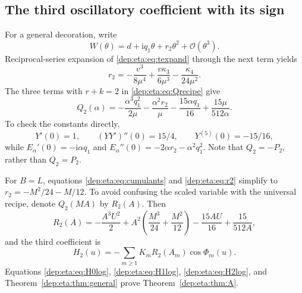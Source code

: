 \documentclass[11pt]{article}
\theoremstyle{definition}\newtheorem{definition}[theorem]{Definition}
\theoremstyle{remark}\newtheorem{remark}[theorem]{Remark}
\newcommand{\OO}{\mathcal O}
\newcommand{\ii}{\mathrm i}
\begin{document}
\subsection{The third oscillatory coefficient with its sign}
For a general decoration, write
\[
 W(\theta)=d+\ii q_1\theta+r_2\theta^2+\OO(\theta^3).
\]
Reciprocal-series expansion of \eqref{dep:eta:eq:texpand} through the next
term yields
\begin{equation}\label{dep:eta:eq:r2}
 r_2=-\frac{v^3}{8\mu^4}
            +\frac{v\kappa_3}{6\mu^3}
            -\frac{\kappa_4}{24\mu^2}.
\end{equation}
The three terms with $r+k=2$ in \eqref{dep:eta:eq:Qrecipe} give
\begin{equation}\label{dep:eta:eq:Q2general}
 Q_2(\alpha)=-\frac{\alpha^3q_1^2}{2\mu}
          -\frac{\alpha^2r_2}{\mu}
          -\frac{15\alpha q_1}{16}
          +\frac{15\mu}{512\alpha}.
\end{equation}
To check the constants directly,
\[
 Y'(0)=1,\qquad (Y Y')''(0)=15/4,\qquad Y^{(5)}(0)=-15/16,
\]
while $E_\alpha'(0)=-\ii\alpha q_1$ and
$E_\alpha''(0)=-2\alpha r_2-\alpha^2q_1^2$.
Note that $Q_2=-P_2$, rather than $Q_2=P_2$.

For $B=L$, equations \eqref{dep:eta:eq:cumulants} and \eqref{dep:eta:eq:r2} simplify
to $r_2=-M^2/24-M/12$. To avoid confusing the scaled variable with
the universal recipe, denote $Q_2(MA)$ by $R_2(A)$. Then
\begin{equation}\label{dep:eta:eq:R2}
 R_2(A)=-\frac{A^3U^2}{2}
          +A^2\left(\frac{M^3}{24}+\frac{M^2}{12}\right)
          -\frac{15AU}{16}+\frac{15}{512A},
\end{equation}
and the third coefficient is
\begin{equation}\label{dep:eta:eq:H2log}
 H_2(u)=-\sum_{m\ge1}K_mR_2(A_m)\cos\Phi_m(u).
\end{equation}
Equations \eqref{dep:eta:eq:H0log}, \eqref{dep:eta:eq:H1log}, \eqref{dep:eta:eq:H2log},
and Theorem~\ref{dep:eta:thm:general} prove Theorem~\ref{dep:eta:thm:A}.
\end{document}

